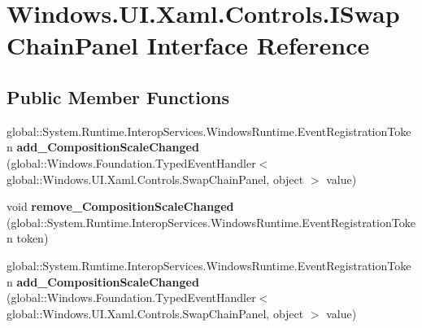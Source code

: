 \hypertarget{interface_windows_1_1_u_i_1_1_xaml_1_1_controls_1_1_i_swap_chain_panel}{}\section{Windows.\+U\+I.\+Xaml.\+Controls.\+I\+Swap\+Chain\+Panel Interface Reference}
\label{interface_windows_1_1_u_i_1_1_xaml_1_1_controls_1_1_i_swap_chain_panel}
\subsection*{Public Member Functions}
\begin{DoxyCompactItemize}
\item 
\mbox{\label{interface_windows_1_1_u_i_1_1_xaml_1_1_controls_1_1_i_swap_chain_panel_a92ad55c6177bf35978f3ebf81ef3b580}} 
global\+::\+System.\+Runtime.\+Interop\+Services.\+Windows\+Runtime.\+Event\+Registration\+Token {\bfseries add\+\_\+\+Composition\+Scale\+Changed} (global\+::\+Windows.\+Foundation.\+Typed\+Event\+Handler$<$ global\+::\+Windows.\+U\+I.\+Xaml.\+Controls.\+Swap\+Chain\+Panel, object $>$ value)
\item 
\mbox{\label{interface_windows_1_1_u_i_1_1_xaml_1_1_controls_1_1_i_swap_chain_panel_a56aa6e47b7bfd71b650a69eba4428d4e}} 
void {\bfseries remove\+\_\+\+Composition\+Scale\+Changed} (global\+::\+System.\+Runtime.\+Interop\+Services.\+Windows\+Runtime.\+Event\+Registration\+Token token)
\item 
\mbox{\label{interface_windows_1_1_u_i_1_1_xaml_1_1_controls_1_1_i_swap_chain_panel_a92ad55c6177bf35978f3ebf81ef3b580}} 
global\+::\+System.\+Runtime.\+Interop\+Services.\+Windows\+Runtime.\+Event\+Registration\+Token {\bfseries add\+\_\+\+Composition\+Scale\+Changed} (global\+::\+Windows.\+Foundation.\+Typed\+Event\+Handler$<$ global\+::\+Windows.\+U\+I.\+Xaml.\+Controls.\+Swap\+Chain\+Panel, object $>$ value)
\item 
\mbox{\label{interface_windows_1_1_u_i_1_1_xaml_1_1_controls_1_1_i_swap_chain_panel_a56aa6e47b7bfd71b650a69eba4428d4e}} 

\end{DoxyCompactItemize}
